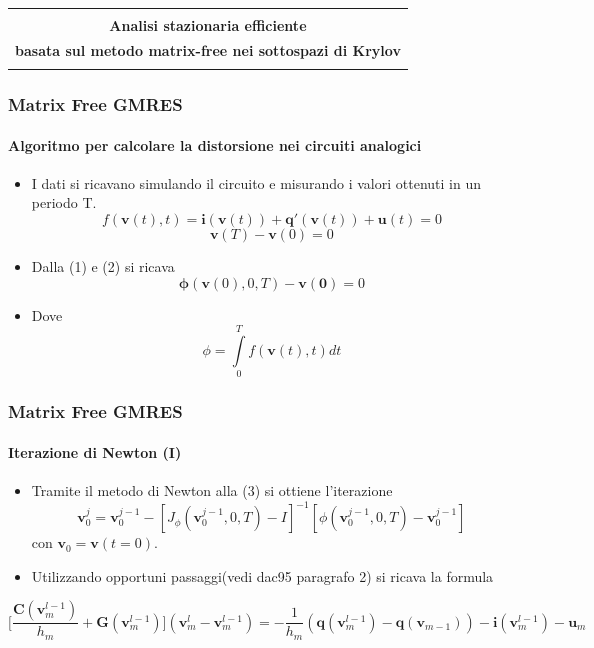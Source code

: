 \documentclass[10pt]{beamer}
\begin{document}
\begin{frame} 
\begin{center}
\begin{tabular}{ c }
\hline\\
 \textbf{Analisi stazionaria efficiente} \\ [0.5ex]
  \textbf{basata sul metodo matrix-free nei sottospazi di Krylov}\\ \\
 \hline
\end{tabular}
\end{center}
\end{frame}


\begin{frame}
\frametitle{Matrix Free GMRES}\framesubtitle{Algoritmo per calcolare la distorsione nei circuiti analogici}
\begin{itemize}
\item I dati si ricavano simulando il circuito e misurando i valori ottenuti in un periodo T.
\begin{equation}
f(\mathbf{v}(t),t) = \mathbf{i}(\mathbf{v}(t)) + \mathbf{q}'(\mathbf{v}(t)) + \mathbf{u}(t) = 0	           
\end{equation}
\begin{equation}
\mathbf{v}(T) - \mathbf{v}(0) = 0 
\end{equation}
\item Dalla (1) e (2) si ricava  \begin{equation}
\mathbf{\phi}(\mathbf{v}(0),0,T) - \mathbf{v(0)}
 = 0
 \end{equation}
\item Dove \[ \phi = \int\limits_0^T f(\mathbf{v}(t),t) dt\]
\end{itemize}
\end{frame}


\begin{frame}
\frametitle{Matrix Free GMRES}
\framesubtitle{Iterazione di Newton (I)}
\begin{itemize}
\item Tramite il metodo di Newton alla (3) si ottiene l'iterazione\begin{equation}
\mathbf{v}_0^j = \mathbf{v}_0^{j-1} - [J_{\phi}(\mathbf{v}_0^{j-1},0,T) - I]^{-1}[\phi(\mathbf{v}_0^{j-1},0,T) - \mathbf{v}_0^{j-1}]
\end{equation}con $\mathbf{v}_0 = \mathbf{v}(t=0)$.       
\item Utilizzando opportuni passaggi(vedi dac95 paragrafo 2) si ricava la formula
\end{itemize} 
 \begin{equation}
\bigg[\frac{\mathbf{C}(\mathbf{v}_m^{l-1})}{h_m} + \mathbf{G}(\mathbf{v}_m^{l-1})\bigg](\mathbf{v}_m^l-\mathbf{v}_m^{l-1}) = - \frac{1}{h_m}(\mathbf{q}(\mathbf{v}_m^{l-1}) - \mathbf{q}(\mathbf{v}_{m-1})) - \mathbf{i}(\mathbf{v}_m^{l-1}) - \mathbf{u}_m
\tag{8}
\end{equation}
\end{frame}
\end{document}
